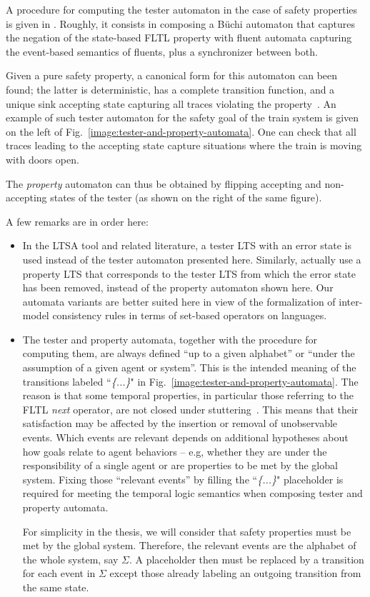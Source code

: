 A procedure for computing the tester automaton in the case of safety properties is given in \cite{Giannakopoulou:2003}. Roughly, it consists in composing a B\"uchi automaton that captures the negation of the state-based FLTL property with fluent automata capturing the event-based semantics of fluents, plus a synchronizer between both. 

Given a pure safety property, a canonical form for this automaton can been found; the latter is deterministic, has a complete transition function, and a unique sink accepting state capturing all traces violating the property~\cite{Giannakopoulou:2003}. An example of such tester automaton for the safety goal of the train system is given on the left of Fig.~\ref{image:tester-and-property-automata}. One can check that all traces leading to the accepting state capture situations where the train is moving with doors open. 

The \emph{property} automaton can thus be obtained by flipping accepting and non-accepting states of the tester (as shown on the right of the same figure). 

A few remarks are in order here:

\begin{itemize}

\item In the LTSA tool \cite{Magee:1999} and related literature, a tester LTS with an error state is used instead of the tester automaton presented here. Similarly, \cite{Letier:2005, Letier:2008} actually use a property LTS that corresponds to the tester LTS from which the error state has been removed, instead of the property automaton shown here. Our automata variants are better suited here in view of the formalization of inter-model consistency rules in terms of set-based operators on languages. 

\item The tester and property automata, together with the procedure for computing them, are always defined ``up to a given alphabet'' or ``under the assumption of a given agent or system''. This is the intended meaning of the transitions labeled ``\emph{\{...\}}" in Fig.~\ref{image:tester-and-property-automata}. The reason is that some temporal properties, in particular those referring to the FLTL \emph{next} operator, are not closed under stuttering~\cite{Lamport:1994}. This means that their satisfaction may be affected by the insertion or removal of unobservable events. Which events are relevant depends on additional hypotheses about how goals relate to agent behaviors -- e.g, whether they are under the responsibility of a single agent or are properties to be met by the global system. Fixing those ``relevant events'' by filling the ``\emph{\{...\}}" placeholder is required for meeting the temporal logic semantics when composing tester and property automata. 

For simplicity in the thesis, we will consider that safety properties must be met by the global system. Therefore, the relevant events are the alphabet of the whole system, say $\Sigma$. A placeholder then must be replaced by a transition for each event in $\Sigma$ except those already labeling an outgoing transition from the same state.

\end{itemize}
